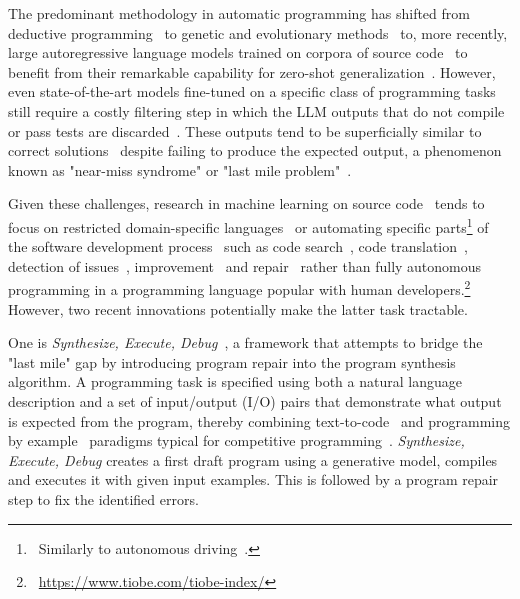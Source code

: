 The predominant methodology in automatic programming has shifted from deductive programming~\cite{manna1992:fundamentals,alur2015:syntaxguided} to genetic and evolutionary methods~\cite{ahvanooey2019:survey} to, more recently, large autoregressive language models trained on corpora of source code~\cite{xu2022:systematic, zan2023:large} to benefit from their remarkable capability for zero-shot generalization~\cite{chen2021:evaluating}.
However, even state-of-the-art models fine-tuned on a specific class of programming tasks still require a costly filtering step in which the LLM outputs that do not compile or pass tests are discarded~\cite{li2022:competitionlevel}.
These outputs tend to be superficially similar to correct solutions~\cite{ren2020:codebleu,liu2023:your, shirafuji2023:exploring} despite failing to produce the expected output, a phenomenon known as "near-miss syndrome" or "last mile problem"~\cite{bavishi2022:neurosymbolic}. 

Given these challenges, research in machine learning on source code~\cite{allamanis2018:survey} tends to focus on restricted domain-specific languages~\cite{chen2021:latent,polozov2015:flashmeta,liventsev2021:bf} or automating specific parts\footnote{~Similarly to autonomous driving~\cite{grigorescu2020:survey,marcano2020:review}.} of the software development process~\cite{lu2021:codexglue,niu2023:crosscodebench} such as code search~\cite{husain2020:codesearchnet}, code translation~\cite{roziere2020:unsupervised}, detection of issues~\cite{fernandes2016:reviewbased,chakraborty2021:deep}, improvement~\cite{petke2018:genetic} and repair~\cite{legoues2019:automated} rather than fully autonomous programming in a programming language popular with human developers.\footnote{~\url{https://www.tiobe.com/tiobe-index/}}
However, two recent innovations potentially make the latter task tractable.

One is \emph{Synthesize, Execute, Debug}~\cite{gupta2020:synthesize}, a framework that attempts to bridge the "last mile" gap by introducing program repair into the program synthesis algorithm. 
A programming task is specified using both a natural language description and a set of input/output (I/O) pairs that demonstrate what output is expected from the program, thereby combining text-to-code~\cite{iyer2018:mapping} and programming by example~\cite{halbert1984:programming,gulwani2016:programming} paradigms typical for competitive programming~\cite{zavershynskyi2018:naps}.
\emph{Synthesize, Execute, Debug} creates a first draft program using a generative model, compiles and executes it with given input examples.
This is followed by a program repair step to fix the identified errors.

